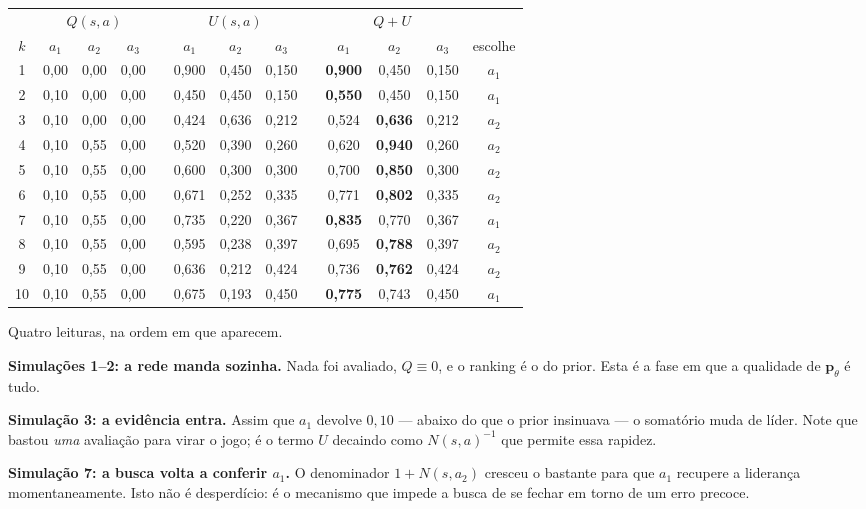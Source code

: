 \documentclass[11pt]{article}
\newcommand{\Nvis}{N}
\newcommand{\redepol}{\bm{p}_{\theta}}
\begin{document}
\begin{center}
\small
\begin{tabular}{c ccc c ccc c ccc c}
\toprule
& \multicolumn{3}{c}{$Q(s,a)$} && \multicolumn{3}{c}{$U(s,a)$} && \multicolumn{3}{c}{$Q+U$} & \\
\cmidrule(lr){2-4}\cmidrule(lr){6-8}\cmidrule(lr){10-12}
$k$ & $a_1$ & $a_2$ & $a_3$ && $a_1$ & $a_2$ & $a_3$ && $a_1$ & $a_2$ & $a_3$ & escolhe \\
\midrule
 1 & 0,00 & 0,00 & 0,00 && 0,900 & 0,450 & 0,150 && \textbf{0,900} & 0,450 & 0,150 & $a_1$ \\
 2 & 0,10 & 0,00 & 0,00 && 0,450 & 0,450 & 0,150 && \textbf{0,550} & 0,450 & 0,150 & $a_1$ \\
 3 & 0,10 & 0,00 & 0,00 && 0,424 & 0,636 & 0,212 && 0,524 & \textbf{0,636} & 0,212 & $a_2$ \\
 4 & 0,10 & 0,55 & 0,00 && 0,520 & 0,390 & 0,260 && 0,620 & \textbf{0,940} & 0,260 & $a_2$ \\
 5 & 0,10 & 0,55 & 0,00 && 0,600 & 0,300 & 0,300 && 0,700 & \textbf{0,850} & 0,300 & $a_2$ \\
 6 & 0,10 & 0,55 & 0,00 && 0,671 & 0,252 & 0,335 && 0,771 & \textbf{0,802} & 0,335 & $a_2$ \\
 7 & 0,10 & 0,55 & 0,00 && 0,735 & 0,220 & 0,367 && \textbf{0,835} & 0,770 & 0,367 & $a_1$ \\
 8 & 0,10 & 0,55 & 0,00 && 0,595 & 0,238 & 0,397 && 0,695 & \textbf{0,788} & 0,397 & $a_2$ \\
 9 & 0,10 & 0,55 & 0,00 && 0,636 & 0,212 & 0,424 && 0,736 & \textbf{0,762} & 0,424 & $a_2$ \\
10 & 0,10 & 0,55 & 0,00 && 0,675 & 0,193 & 0,450 && \textbf{0,775} & 0,743 & 0,450 & $a_1$ \\
\bottomrule
\end{tabular}
\end{center}

Quatro leituras, na ordem em que aparecem.

\textbf{Simulações 1--2: a rede manda sozinha.} Nada foi avaliado, $Q \equiv 0$, e
o ranking é o do prior. Esta é a fase em que a qualidade de $\redepol$ é tudo.

\textbf{Simulação 3: a evidência entra.} Assim que $a_1$ devolve $0{,}10$ —
abaixo do que o prior insinuava — o somatório muda de líder. Note que bastou
\emph{uma} avaliação para virar o jogo; é o termo $U$ decaindo como
$\Nvis(s,a)^{-1}$ que permite essa rapidez.

\textbf{Simulação 7: a busca volta a conferir $a_1$.} O denominador
$1+\Nvis(s,a_2)$ cresceu o bastante para que $a_1$ recupere a liderança
momentaneamente. Isto não é desperdício: é o mecanismo que impede a busca de se
fechar em torno de um erro precoce.
\end{document}
